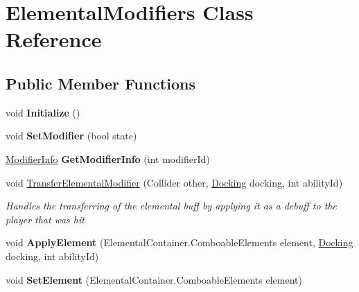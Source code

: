 \hypertarget{class_elemental_modifiers}{}\section{Elemental\+Modifiers Class Reference}
\label{class_elemental_modifiers}
\subsection*{Public Member Functions}
\begin{DoxyCompactItemize}
\item 
\hypertarget{class_elemental_modifiers_ad6ab24d4a74892222f8ffbfe212df585}{}\label{class_elemental_modifiers_ad6ab24d4a74892222f8ffbfe212df585} 
void {\bfseries Initialize} ()
\item 
\hypertarget{class_elemental_modifiers_afa5d26d24188ef923197b67c733c889a}{}\label{class_elemental_modifiers_afa5d26d24188ef923197b67c733c889a} 
void {\bfseries Set\+Modifier} (bool state)
\item 
\hypertarget{class_elemental_modifiers_a37b58d1b235a81714dee54b9bdb6938d}{}\label{class_elemental_modifiers_a37b58d1b235a81714dee54b9bdb6938d} 
\hyperlink{struct_modifier_info}{Modifier\+Info} {\bfseries Get\+Modifier\+Info} (int modifier\+Id)
\item 
void \hyperlink{class_elemental_modifiers_ab78c8c14e739e2b9e2a3478013361901}{Transfer\+Elemental\+Modifier} (Collider other, \hyperlink{class_docking}{Docking} docking, int ability\+Id)
\begin{DoxyCompactList}\small\item\em Handles the transferring of the elemental buff by applying it as a debuff to the player that was hit \end{DoxyCompactList}\item 
\hypertarget{class_elemental_modifiers_adf82cd15ec409b9356ad977a399a531a}{}\label{class_elemental_modifiers_adf82cd15ec409b9356ad977a399a531a} 
void {\bfseries Apply\+Element} (Elemental\+Container.\+Comboable\+Elements element, \hyperlink{class_docking}{Docking} docking, int ability\+Id)
\item 
\hypertarget{class_elemental_modifiers_a61148184aade5705179dd9024141fa19}{}\label{class_elemental_modifiers_a61148184aade5705179dd9024141fa19} 
void {\bfseries Set\+Element} (Elemental\+Container.\+Comboable\+Elements element)
\end{DoxyCompactItemize}

